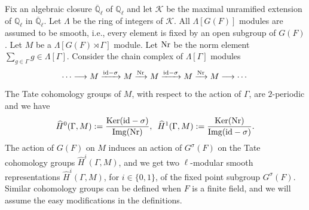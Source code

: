 \documentclass[10pt, reqno]{amsart}
\theoremstyle{plain}
\numberwithin{equation}{section} \newcommand{\di}{\operatorname{dim}}
\begin{document}
\subsection{}
Fix an algebraic closure $\overline{\mathbb{Q}}_\ell$ of
$\mathbb{Q}_\ell$ and let $\mathcal{K}$ be the maximal unramified
extension of $\mathbb{Q}_\ell$ in $\overline{\mathbb{Q}}_\ell$. Let
$\Lambda$ be the ring of integers of $\mathcal{K}$. All
$\Lambda[G(F)]$ modules are assumed to be smooth, i.e., every element
is fixed by an open subgroup of $G(F)$. 
Let $M$ be a
$\Lambda[G(F)\rtimes \Gamma]$ module. Let ${\rm Nr}$ be the norm
element $\sum_{g\in \Gamma}g\in \Lambda[\Gamma]$.  Consider the 
 chain complex of $\Lambda[\Gamma]$ modules
$$ \cdots\longrightarrow M\xrightarrow{{\rm id}-\sigma}
M\xrightarrow{{\rm Nr}} M\xrightarrow{{\rm id}-\sigma}
M\xrightarrow{{\rm Nr}} M\longrightarrow\cdots $$ The Tate cohomology
groups of $M$, with respect to the action of $\Gamma$, are
$2$-periodic and we have
$$ \widehat{H}^0(\Gamma, M) := \dfrac{{\rm Ker}({\rm id}-\sigma)}
{{\rm Img}({\rm Nr})},\,\,\, \widehat{H}^1(\Gamma, M) := \dfrac{{\rm
    Ker}({\rm Nr})} {{\rm Img}({\rm id}-\sigma)}. $$ The action of
$G(F)$ on $M$ induces an action of $G^\sigma(F)$ on the Tate
cohomology groups $\widehat{H}^i(\Gamma, M)$, and we get two
$\ell$-modular smooth representations $\widehat{H}^i(\Gamma, M)$, for
$i\in \{0,1\}$, of the fixed point subgroup $G^\sigma(F)$. Similar
cohomology groups can be defined when $F$ is a finite field, and we
will assume the easy modifications in the definitions.
\end{document}
